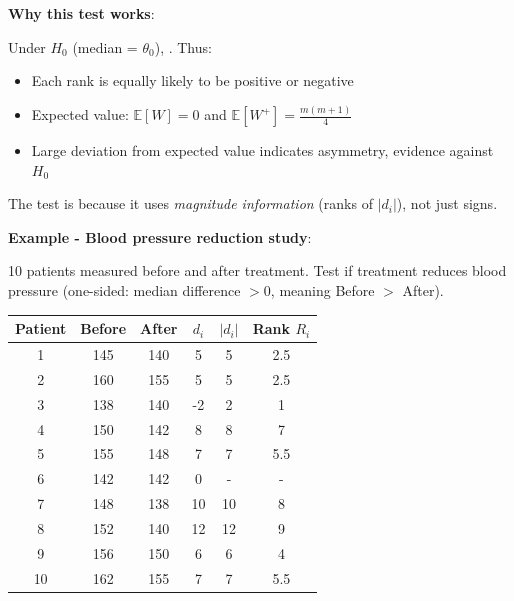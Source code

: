 \textbf{Why this test works}:

Under $H_0$ (median = $\theta_0$), . Thus:
\begin{itemize}
    \item Each rank is equally likely to be positive or negative
    \item Expected value: $\mathbb{E}[W] = 0$ and $\mathbb{E}[W^+] = \frac{m(m+1)}{4}$
    \item Large deviation from expected value indicates asymmetry, evidence against $H_0$
\end{itemize}

The test is  because it uses \emph{magnitude information}
(ranks of $|d_i|$), not just signs.

\textbf{Example - Blood pressure reduction study}:

10 patients measured before and after treatment. Test if treatment reduces blood pressure
(one-sided: median difference $> 0$, meaning Before $>$ After).

\begin{center}
\begin{tabular}{|c|c|c|c|c|c|}
    \hline
    \textbf{Patient} & \textbf{Before} & \textbf{After} & \textbf{$d_i$} & \textbf{$|d_i|$} & \textbf{Rank $R_i$} \\
    \hline
    1 & 145 & 140 & 5 & 5 & 2.5 \\
    2 & 160 & 155 & 5 & 5 & 2.5 \\
    3 & 138 & 140 & -2 & 2 & 1 \\
    4 & 150 & 142 & 8 & 8 & 7 \\
    5 & 155 & 148 & 7 & 7 & 5.5 \\
    6 & 142 & 142 & 0 & - & - \\
    7 & 148 & 138 & 10 & 10 & 8 \\
    8 & 152 & 140 & 12 & 12 & 9 \\
    9 & 156 & 150 & 6 & 6 & 4 \\
    10 & 162 & 155 & 7 & 7 & 5.5 \\
    \hline
\end{tabular}
\end{center}

